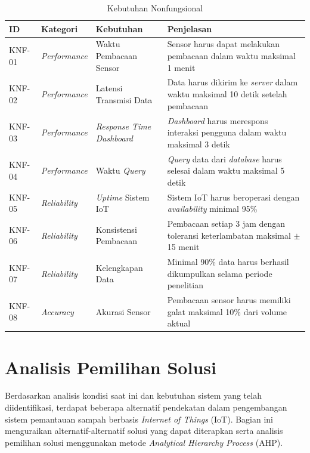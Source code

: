 \begin{table}[H]
  \caption{Kebutuhan Nonfungsional}
  \label{tab:kebutuhan-nonfungsional}
  \begin{tabularx}{\textwidth}{| l | l | X | X |}
    \hline
    \textbf{ID} & \textbf{Kategori} & \textbf{Kebutuhan} & \textbf{Penjelasan} \\
    \hline
    KNF-01 & \textit{Performance} & Waktu Pembacaan Sensor & Sensor harus dapat melakukan pembacaan dalam waktu maksimal 1 menit \\
    \hline
    KNF-02 & \textit{Performance} & Latensi Transmisi Data & Data harus dikirim ke \textit{server} dalam waktu maksimal 10 detik setelah pembacaan \\
    \hline
    KNF-03 & \textit{Performance} & \textit{Response Time Dashboard} & \textit{Dashboard} harus merespons interaksi pengguna dalam waktu maksimal 3 detik \\
    \hline
    KNF-04 & \textit{Performance} & Waktu \textit{Query} & \textit{Query} data dari \textit{database} harus selesai dalam waktu maksimal 5 detik \\
    \hline
    KNF-05 & \textit{Reliability} & \textit{Uptime} Sistem IoT & Sistem IoT harus beroperasi dengan \textit{availability} minimal 95\% \\
    \hline
    KNF-06 & \textit{Reliability} & Konsistensi Pembacaan & Pembacaan setiap 3 jam dengan toleransi keterlambatan maksimal $\pm$15 menit \\
    \hline
    KNF-07 & \textit{Reliability} & Kelengkapan Data & Minimal 90\% data harus berhasil dikumpulkan selama periode penelitian \\
    \hline
    KNF-08 & \textit{Accuracy} & Akurasi Sensor & Pembacaan sensor harus memiliki galat maksimal 10\% dari volume aktual \\
    \hline
  \end{tabularx}
\end{table}

\section{Analisis Pemilihan Solusi}
\label{sec:analisis-solusi}

Berdasarkan analisis kondisi saat ini dan kebutuhan sistem yang telah diidentifikasi, terdapat beberapa alternatif pendekatan dalam pengembangan sistem pemantauan sampah berbasis \textit{Internet of Things} (IoT). Bagian ini menguraikan alternatif-alternatif solusi yang dapat diterapkan serta analisis pemilihan solusi menggunakan metode \textit{Analytical Hierarchy Process} (AHP).

